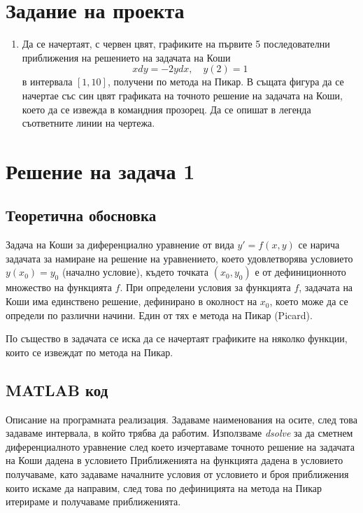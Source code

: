 \documentclass[12pt]{article}
\begin{document}
\section{Задание на проекта}
\begin{enumerate}
	\item Да се начертаят, с червен цвят, графиките на първите 5 последователни приближения на решението на задачата на Коши $$xdy=-2ydx,\quad y(2)=1$$ в интервала $[1,10]$, получени по метода на Пикар. В същата фигура да се начертае със син цвят графиката на точното решение на задачата на Коши, което да се извежда в командния прозорец. Да се опишат в легенда съответните линии на чертежа.
\end{enumerate}
\newpage
\section{Решение на задача 1}
\subsection{Теоретична обосновка}
Задача на Коши за диференциално уравнение от вида $y'=f(x,y)$ се нарича задачата за намиране на решение на уравнението, което удовлетворява условието $y(x_0)=y_0$ (начално условие), където точката $(x_0,y_0)$ е от дефиниционното множество на функцията $f$. При определени условия за функцията $f$, задачата на Коши има единствено решение, дефинирано в околност на $x_0$, което може да се определи по различни начини. Един от тях е метода на Пикар (Picard).

По същество в задачата се иска да се начертаят графиките на няколко функции, които се извеждат по метода на Пикар. 
\subsection{MATLAB код}
Описание на програмната реализация. Задаваме наименования на осите, след това задаваме интервала, в който трябва да работим. Използваме \textit{dsolve} за да сметнем диференциалното уравнение след което изчертаваме точното решение на задачата на Коши дадена в условието Приближенията на функцията дадена в условието получаваме, като задаваме началните условия от условието и броя приближения които искаме да направим, след това по дефиницията на метода на Пикар итерираме и получаваме приближенията.
\end{document}
